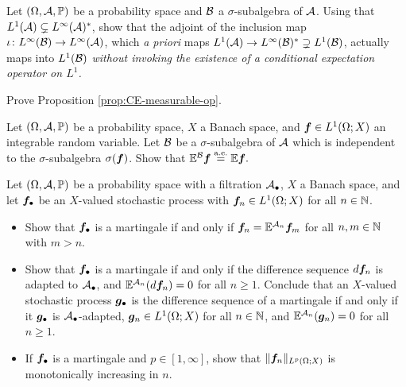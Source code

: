 \begin{exercise}\label{ex:conditional-expectation-as-adjoint}
  Let $(\Omega,\mathcal{A},\mathbb{P})$ be a probability space and $\mathcal{B}$ a $\sigma$-subalgebra of $\mathcal{A}$.
  Using that $L^1(\mathcal{A}) \subsetneq L^\infty(\mathcal{A})^*$, show that the adjoint of the inclusion map $\iota \colon L^\infty(\mathcal{B}) \rightarrow L^\infty(\mathcal{A})$, which \emph{a priori} maps $L^1(\mathcal{A}) \to L^\infty(\mathcal{B})^* \supsetneq L^1(\mathcal{B})$, actually maps into $L^1(\mathcal{B})$ \emph{without invoking the existence of a conditional expectation operator on $L^1$.}
\end{exercise}

\begin{exercise}\label{ex:CE-measurable-op}
  Prove Proposition \ref{prop:CE-measurable-op}.
\end{exercise}

\begin{exercise}\label{ex:ce-ind}
  Let $(\Omega,\mathcal{A},\mathbb{P})$ be a probability space, $X$ a Banach space, and $\bm{f} \in L^1(\Omega;X)$ an integrable random variable.
  Let $\mathcal{B}$ be a $\sigma$-subalgebra of $\mathcal{A}$ which is independent to the $\sigma$-subalgebra $\sigma(\bm{f})$.
  Show that $\mathbb{E}^{\mathcal{B}} \bm{f} \stackrel{\mathrm{a.e.}}{=} \mathbb{E} \bm{f}.$
\end{exercise}

\begin{exercise}\label{ex:martingale-elementary-properties}
  Let $(\Omega,\mathcal{A},\mathbb{P})$ be a probability space with a filtration $\mathcal{A}_{\bullet}$, $X$ a Banach space, and let $\bm{f}_{\bullet}$ be an $X$-valued stochastic process with $\bm{f}_{n} \in L^1(\Omega;X)$ for all $n \in \mathbb{N}$.
  \begin{itemize}
  \item
    Show that $\bm{f}_{\bullet}$ is a martingale if and only if $\bm{f}_n = \mathbb{E}^{\mathcal{A}_n} \bm{f}_m$ for all $n,m \in \mathbb{N}$ with $m > n$.
  \item
    Show that $\bm{f}_{\bullet}$ is a martingale if and only if the difference sequence $d\bm{f}_{n}$ is adapted to $\mathcal{A}_{\bullet}$, and $\mathbb{E}^{\mathcal{A}_{n}} (d\bm{f}_{n}) = 0$ for all $n \geq 1$.
    Conclude that an $X$-valued stochastic process $\bm{g}_{\bullet}$ is the difference sequence of a martingale if and only if it $\bm{g}_{\bullet}$ is $\mathcal{A}_{\bullet}$-adapted, $\bm{g}_{n} \in L^1(\Omega;X)$ for all $n \in \mathbb{N}$, and $\mathbb{E}^{\mathcal{A}_{n}}(\bm{g}_{n}) = 0$ for all $n \geq 1$.
  \item
    If $\bm{f}_{\bullet}$ is a martingale and $p \in [1,\infty]$, show that $\|\bm{f}_{n}\|_{L^p(\Omega;X)}$ is monotonically increasing in $n$.
  \end{itemize}
\end{exercise}

